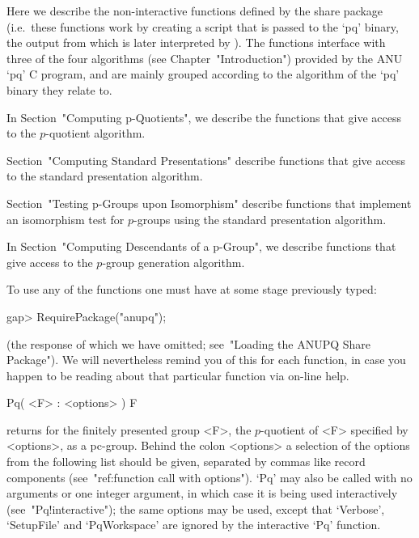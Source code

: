 

Here we describe the non-interactive functions defined  by  the  {\ANUPQ}
share package (i.e.~these functions work by creating  a  script  that  is
passed to the `pq' binary, the output from which is later interpreted  by
{\GAP}). The functions interface with three of the four  algorithms  (see
Chapter~"Introduction") provided by the  ANU  `pq'  C  program,  and  are
mainly grouped according to the algorithm of the `pq' binary they  relate
to.

In Section~"Computing p-Quotients", we describe the functions  that  give
access to the $p$-quotient algorithm.

Section~"Computing Standard Presentations" describe functions  that  give
access to the standard presentation algorithm.

Section~"Testing  p-Groups  upon  Isomorphism"  describe  functions  that
implement  an  isomorphism  test  for  $p$-groups  using   the   standard
presentation algorithm.

In Section~"Computing Descendants of a p-Group",  we  describe  functions
that give access to the $p$-group generation algorithm.

To use any of the functions one must have at some stage previously typed:

\beginexample
gap> RequirePackage("anupq");
\endexample

(the response of which we have  omitted;  see~"Loading  the  ANUPQ  Share
Package"). We will nevertheless remind you of this for each function,  in
case you happen to be reading about that particular function via  on-line
help.


\>Pq( <F> : <options> ) F

returns for the finitely presented group <F>,  the  $p$-quotient  of  <F>
specified by <options>, as a  pc-group.  Behind  the  colon  <options>  a
selection of the  options  from  the  following  list  should  be  given,
separated by commas like record components (see~"ref:function  call  with
options"). `Pq' may also be called  with  no  arguments  or  one  integer
argument,   in   which   case   it   is    being    used    interactively
(see~"Pq!interactive");  the  same  options  may  be  used,  except  that
`Verbose', `SetupFile' and `PqWorkspace' are ignored by  the  interactive
`Pq' function.

